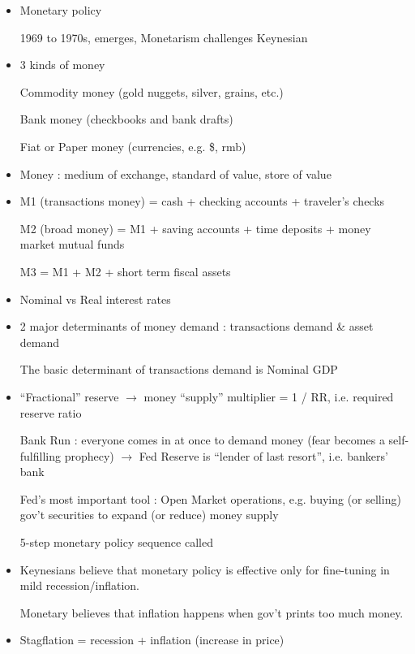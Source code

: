\documentclass{article}
\begin{document}
\newpage
{}
\begin{itemize}
\item Monetary policy

1969 to 1970s,  emerges, Monetarism challenges Keynesian

\item 3 kinds of money

Commodity money (gold nuggets, silver, grains, etc.)

Bank money (checkbooks and bank drafts)

Fiat or Paper money (currencies, e.g. \$, rmb)


\item Money : medium of exchange, standard of value, store of value

\item M1 (transactions money) = cash + checking accounts + traveler's checks

M2 (broad money) = M1 + saving accounts + time deposits + money market mutual funds

M3 = M1 + M2 + short term fiscal assets

\item Nominal vs Real interest rates


\item 2 major determinants of money demand : transactions demand \& asset demand

The basic determinant of transactions demand is Nominal GDP

\item ``Fractional'' reserve $\rightarrow$ money ``supply'' multiplier = 1 / RR, i.e. required reserve ratio

Bank Run : everyone comes in at once to demand money (fear becomes a self-fulfilling prophecy) $\rightarrow$ Fed Reserve is ``lender of last resort'', i.e. bankers' bank

Fed's most important tool : Open Market operations, e.g. buying (or selling) gov't securities to expand (or reduce) money supply

5-step monetary policy sequence called 

\item Keynesians believe that monetary policy is effective only for fine-tuning in mild recession/inflation.

Monetary believes that inflation happens when gov't prints too much money.

\item Stagflation = recession + inflation (increase in price)
\end{itemize}
\end{document}
